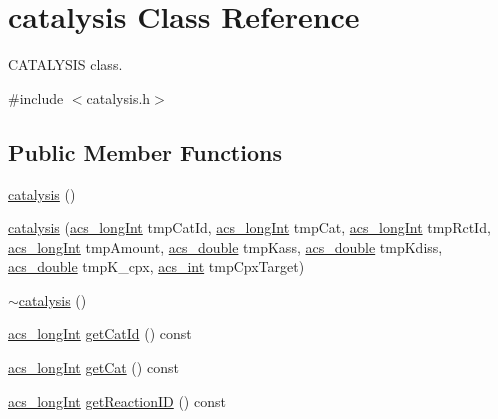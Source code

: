 \hypertarget{classcatalysis}{\section{catalysis Class Reference}
\label{classcatalysis}
}


C\-A\-T\-A\-L\-Y\-S\-I\-S class.  




{\ttfamily \#include $<$catalysis.\-h$>$}

\subsection*{Public Member Functions}
\begin{DoxyCompactItemize}
\item 
\hyperlink{classcatalysis_a7c4d1a67d2745293a17a6bee0df7c5cd}{catalysis} ()
\item 
\hyperlink{classcatalysis_ab6af429c051e2bc9756bac72b99cc4ce}{catalysis} (\hyperlink{acs__headers_8h_a19319d75f02db4308bc5c0026d98cd85}{acs\-\_\-long\-Int} tmp\-Cat\-Id, \hyperlink{acs__headers_8h_a19319d75f02db4308bc5c0026d98cd85}{acs\-\_\-long\-Int} tmp\-Cat, \hyperlink{acs__headers_8h_a19319d75f02db4308bc5c0026d98cd85}{acs\-\_\-long\-Int} tmp\-Rct\-Id, \hyperlink{acs__headers_8h_a19319d75f02db4308bc5c0026d98cd85}{acs\-\_\-long\-Int} tmp\-Amount, \hyperlink{acs__headers_8h_ab776853a005fcbf56af0424a2a4dd607}{acs\-\_\-double} tmp\-Kass, \hyperlink{acs__headers_8h_ab776853a005fcbf56af0424a2a4dd607}{acs\-\_\-double} tmp\-Kdiss, \hyperlink{acs__headers_8h_ab776853a005fcbf56af0424a2a4dd607}{acs\-\_\-double} tmp\-K\-\_\-cpx, \hyperlink{acs__headers_8h_a8d277355641a098190360234e2ebde35}{acs\-\_\-int} tmp\-Cpx\-Target)
\item 
\hyperlink{classcatalysis_a982805165c59e95ac055dc24e684fa05}{$\sim$catalysis} ()
\item 
\hyperlink{acs__headers_8h_a19319d75f02db4308bc5c0026d98cd85}{acs\-\_\-long\-Int} \hyperlink{classcatalysis_a85ba5bd9c758392f245f1277141a1706}{get\-Cat\-Id} () const 
\item 
\hyperlink{acs__headers_8h_a19319d75f02db4308bc5c0026d98cd85}{acs\-\_\-long\-Int} \hyperlink{classcatalysis_a205e222dff1e80ff8f3195ab22e78726}{get\-Cat} () const 
\item 
\hyperlink{acs__headers_8h_a19319d75f02db4308bc5c0026d98cd85}{acs\-\_\-long\-Int} \hyperlink{classcatalysis_a6e0eea2f12109b36bb522ac971d1db29}{get\-Reaction\-I\-D} () const 
\item 

\end{DoxyCompactItemize}
